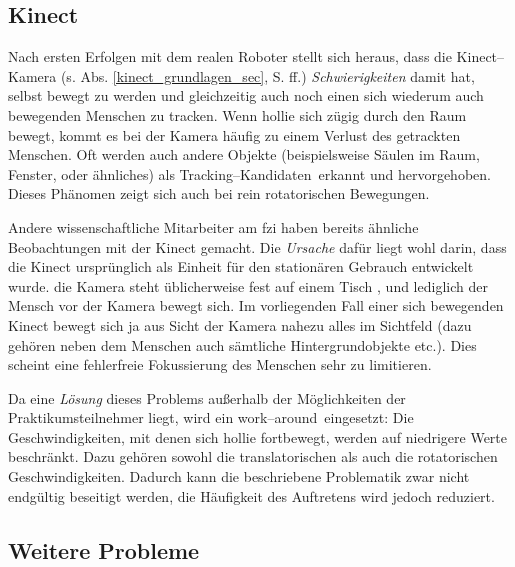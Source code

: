 \subsection{Kinect}
\label{test_kinect}

Nach ersten Erfolgen mit dem realen Roboter stellt sich heraus, dass die Kinect--Kamera (s. Abs. \ref{kinect_grundlagen_sec}, S. \pageref{kinect_grundlagen_sec} ff.) \emph{Schwierigkeiten} damit hat, selbst bewegt zu werden und gleichzeitig auch noch einen sich wiederum auch bewegenden Menschen zu tracken.
Wenn \gls{hollie} sich zügig durch den Raum bewegt, kommt es bei der Kamera häufig zu einem Verlust des getrackten Menschen.
Oft werden auch andere Objekte (beispielsweise Säulen im Raum, Fenster, oder ähnliches) als \glqq Tracking--Kandidaten\grqq\ erkannt und hervorgehoben.
Dieses Phänomen zeigt sich auch bei rein rotatorischen Bewegungen.

Andere wissenschaftliche Mitarbeiter am \gls{fzi} haben bereits ähnliche Beobachtungen mit der Kinect gemacht.
Die \emph{Ursache} dafür liegt wohl darin, dass die Kinect ursprünglich als Einheit für den stationären Gebrauch entwickelt wurde.
\Dh die Kamera steht üblicherweise fest auf einem Tisch \oae, und lediglich der Mensch vor der Kamera bewegt sich.
Im vorliegenden Fall einer sich bewegenden Kinect bewegt sich ja aus Sicht der Kamera nahezu alles im Sichtfeld (dazu gehören neben dem Menschen auch sämtliche Hintergrundobjekte etc.).
Dies scheint eine fehlerfreie Fokussierung des Menschen sehr zu limitieren.

Da eine \emph{Lösung} dieses Problems außerhalb der Möglichkeiten der Praktikumsteilnehmer liegt, wird ein \glqq work--around\grqq\ eingesetzt:
Die Geschwindigkeiten, mit denen sich \gls{hollie} fortbewegt, werden auf niedrigere Werte beschränkt.
Dazu gehören sowohl die translatorischen als auch die rotatorischen Geschwindigkeiten.
Dadurch kann die beschriebene Problematik zwar nicht endgültig beseitigt werden, die Häufigkeit des Auftretens wird jedoch reduziert.




\subsection{Weitere Probleme}

